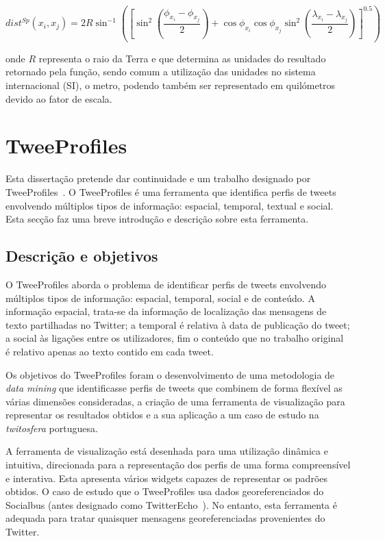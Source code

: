 \begin{equation}
dist^{Sp}( x_{i}, x_{j}) = 2R\sin^{-1}\left( \left[ \sin^{2}(\frac{\phi_{x_{i}}-\phi_{x_{j}}}{2})+\cos\phi_{x_{i}}\cos\phi_{x_{j}}\sin^{2}(\frac{\lambda_{x_{i}}-\lambda_{x_{j}}}{2})\right] ^{0.5}\right) 
\label{eq:hav} 
\end{equation}

onde $ R $ representa o raio da Terra e que determina as unidades do resultado retornado pela função, sendo comum a utilização das unidades no sistema internacional (SI), o metro, podendo também ser representado em quilómetros devido ao fator de escala. 



\section{TweeProfiles} \label{sec:tweep}

Esta dissertação pretende dar continuidade e um trabalho designado por TweeProfiles~\cite{Cunha2013}. O TweeProfiles é uma ferramenta que identifica perfis de tweets envolvendo múltiplos tipos de informação: espacial, temporal, textual e social. Esta secção faz uma breve introdução e descrição sobre esta ferramenta.

\subsection{Descrição e objetivos}

O TweeProfiles aborda o problema de identificar perfis de tweets envolvendo múltiplos tipos de informação: espacial, temporal, social e de conteúdo. A informação espacial, trata-se da informação de localização das mensagens de texto partilhadas no Twitter; a temporal é relativa à data de publicação do tweet; a social às ligações entre os utilizadores, fim o conteúdo que no trabalho original é relativo apenas ao texto contido em cada tweet. 

Os objetivos do TweeProfiles foram o desenvolvimento de uma metodologia de \textit{data mining} que identificasse perfis de tweets que combinem de forma flexível as várias dimensões consideradas, a criação de uma ferramenta de visualização para representar os resultados obtidos e a sua aplicação a um caso de estudo na \textit{twitosfera} portuguesa.
 
A ferramenta de visualização está desenhada para uma utilização dinâmica e intuitiva, direcionada para a representação dos perfis de uma forma compreensível e interativa. Esta apresenta vários widgets capazes de representar os padrões obtidos.
O caso de estudo que o TweeProfiles usa dados georeferenciados do Socialbus (antes designado como TwitterEcho~\cite{Boanjak2012}). No entanto, esta ferramenta é adequada para tratar quaisquer mensagens georeferenciadas provenientes do Twitter.

